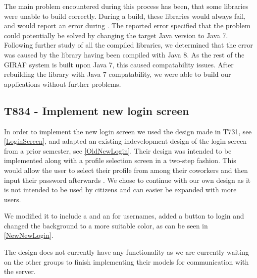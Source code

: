 The main problem encountered during this process has been, that some libraries
were unable to build correctly. During a build, these libraries would always
fail, and would report an error during
. The reported error specified
that the problem could potentially be solved by changing the target Java version
to Java 7. Following further study of all the compiled libraries, we determined
that the error was caused by the  library having been
compiled with Java 8. As the rest of the GIRAF system is built upon Java 7, this caused
compatability issues. After rebuilding the library with Java 7 compatability, we
were able to build our applications without further problems.

\subsection{T834 - Implement new login screen}\label{LoginXML}
In order to implement the new login screen we used the design made in T731,
see \autoref{LoginScreen}, and adapted an existing indevelopment design of
the login screen from a prior semester, see \autoref{OldNewLogin}. Their design
was intended to be implemented along with a profile selection screen in
a two-step fashion. This would allow the user to select their profile from
among their coworkers and then input their password afterwards \citep[Ch.9.5,
p.68-70]{RestLogin}. We chose to continue with our own design as it is
not intended to be used by citizens and can easier be expanded with more users.


We modified it to include a  and an  for
usernames, added a button to login and changed the background to a more suitable
color, as can be seen in \autoref{NewNewLogin}.


The design does not currently have any functionality as we are currently waiting
on the other groups to finish implementing their models for communication with
the server.

